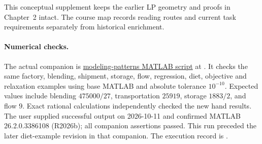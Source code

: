 \documentclass[11pt,a4paper]{article}
\begin{document}
This conceptual supplement keeps the earlier LP geometry and proofs in
Chapter~2 intact. The course map records reading routes
and current task requirements separately from historical enrichment.

\paragraph{Numerical checks.}
The actual companion is
\href{run:matlab/exercises/modeling_patterns_checks.m}{modeling-patterns MATLAB script}
at .
It checks the same factory, blending, shipment, storage, flow, regression, diet,
objective and relaxation examples using base MATLAB and absolute tolerance
$10^{-10}$. Expected values include blending $475000/27$, transportation $25919$,
storage $1883/2$, and flow $9$. Exact rational calculations independently
checked the new hand results. The user supplied successful output on 2026-10-11
and confirmed MATLAB 26.2.0.3386108 (R2026b); all companion assertions passed.
This run preceded the later diet-example revision in that companion.
The execution record is .
\end{document}
